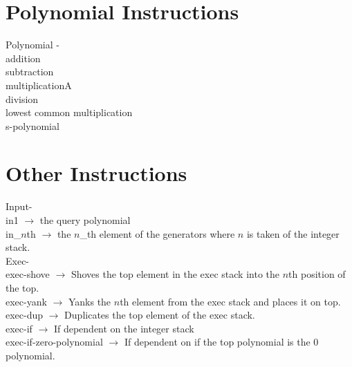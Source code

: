 \documentclass[20pt]{extarticle}
\begin{document}
\newpage
\section*{Polynomial Instructions}

Polynomial - \\
\indent addition \\
\indent subtraction     \\   
\indent multiplicationA \\
\indent division \\
\indent lowest common multiplication \\
\indent s-polynomial \\

\newpage
\section*{Other Instructions}

\noindent Input- \\
\indent in1 $\rightarrow$ the query polynomial \\
\indent in\_$n$th $\rightarrow$ the $n$\_th element of the generators where $n$ is taken of the integer stack. \\

\noindent Exec- \\
\indent exec-shove $\rightarrow$ Shoves the top element in the exec stack into the $n$th position of the top. \\
\indent exec-yank $\rightarrow$ Yanks the $n$th element from the exec stack and places it on top. \\
\indent exec-dup $\rightarrow$ Duplicates the top element of the exec stack. \\
\indent exec-if $\rightarrow$ If dependent on the integer stack \\
\indent exec-if-zero-polynomial $\rightarrow$ If dependent on if the top polynomial is the 0 polynomial. \\

\end{document}
